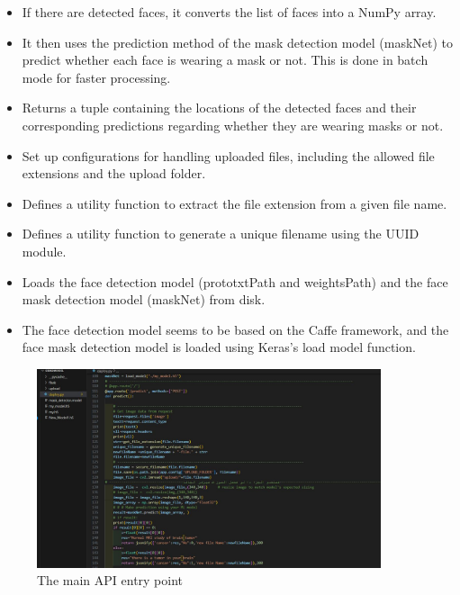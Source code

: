 \begin{itemize}
    \item If there are detected faces, it converts the list of faces into a NumPy array.
    \item It then uses the prediction method of the mask detection model (maskNet) to predict whether each face is wearing a mask or not. This is done in batch mode for faster processing.
    \item Returns a tuple containing the locations of the detected faces and their corresponding predictions regarding whether they are wearing masks or not.
    \item Set up configurations for handling uploaded files, including the allowed file extensions and the upload folder.
    \item Defines a utility function to extract the file extension from a given file name.
    \item Defines a utility function to generate a unique filename using the UUID module.
    \item Loads the face detection model (prototxtPath and weightsPath) and the face mask detection model (maskNet) from disk.
    \item The face detection model seems to be based on the Caffe framework, and the face mask detection model is loaded using Keras's load model function.
\end{itemize}

\begin{figure}
    \centering
    \includegraphics[width=0.90\textwidth]{Img/Chap-01/46.jpg}
    \caption{The main API entry point}
    \label{fig:be_5}
\end{figure}

